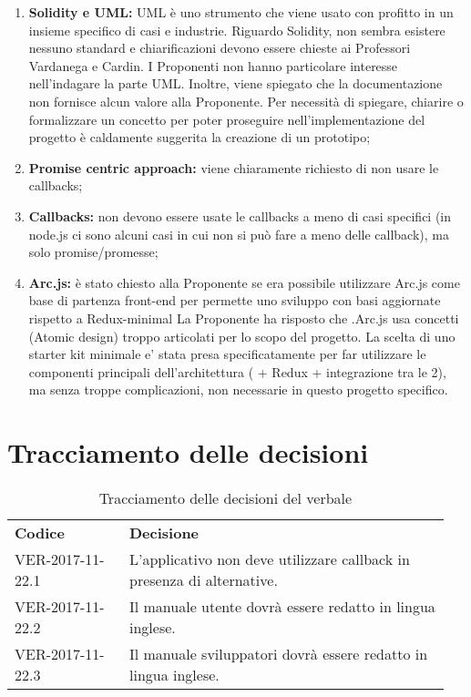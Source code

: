 \documentclass[VER-2017-11-22.tex]{subfiles}
\begin{document}
\begin{enumerate}
	\item \textbf{Solidity e UML:} UML è uno strumento che viene usato con profitto in un insieme specifico di casi e industrie. Riguardo Solidity, non sembra esistere nessuno standard e chiarificazioni devono essere chieste ai Professori Vardanega e Cardin. I Proponenti non hanno particolare interesse nell'indagare la parte UML. Inoltre, viene spiegato che la documentazione non fornisce alcun valore alla Proponente. Per necessità di spiegare, chiarire o formalizzare un concetto per poter proseguire nell'implementazione del progetto è caldamente suggerita la creazione di un prototipo;
	
	\item \textbf{Promise centric approach:} viene chiaramente richiesto di non usare le callbacks;
	
	\item \textbf{Callbacks:} non devono essere usate le callbacks a meno di casi specifici (in node.js ci sono alcuni casi in cui non si può fare a meno delle callback), ma solo promise/promesse;
	
	\item \textbf{Arc.js:} è stato chiesto alla Proponente se era possibile utilizzare Arc.js come base di partenza front-end per permette uno sviluppo con basi aggiornate rispetto a Redux-minimal La Proponente ha risposto che .Arc.js usa concetti (Atomic design) troppo articolati per lo scopo del progetto. La scelta di uno starter kit minimale e' stata presa specificatamente per far utilizzare le  componenti principali dell'architettura  ( + Redux + integrazione tra le 2), ma senza troppe complicazioni, non necessarie in questo progetto specifico.
\end{enumerate}
\section{Tracciamento delle decisioni}
\begin{table}[H]
	\begin{center}
		\begin{tabu} to 
			\tableHeaderStyle
			\textbf{Codice} & \textbf{Decisione} \\
			VER-2017-11-22.1 & L'applicativo non deve utilizzare callback in presenza di alternative. \\
			VER-2017-11-22.2 & Il manuale utente dovrà essere redatto in lingua inglese. \\
			VER-2017-11-22.3 & Il manuale sviluppatori dovrà essere redatto in lingua inglese. \\
		\end{tabu}
		\caption{Tracciamento delle decisioni del verbale}
	\end{center}
\end{table}
\end{document}
